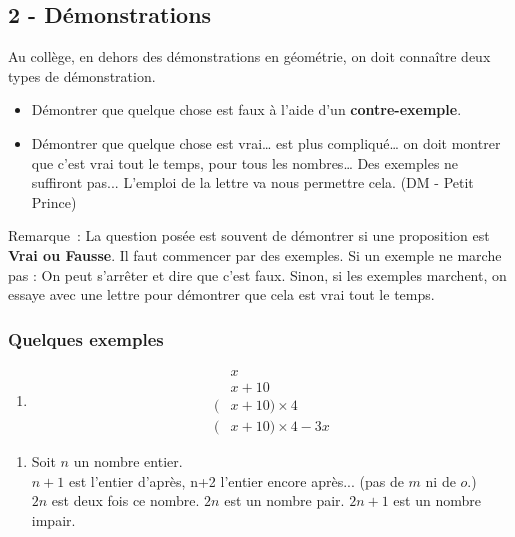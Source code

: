 \documentclass[11pt]{article}
\begin{document}
\subsection*{2 - Démonstrations}

Au collège, en dehors des démonstrations en géométrie, on doit connaître deux types de démonstration.

\begin{itemize}
\item Démontrer que quelque chose est faux à l’aide d’un \textbf{contre-exemple}.
\item Démontrer que quelque chose est vrai… est plus compliqué… on doit montrer que c’est vrai tout le temps, pour tous les nombres… Des exemples ne suffiront pas$...$ L’emploi de la lettre va nous permettre cela. (DM - Petit Prince)
\end{itemize} 

Remarque : La question posée est souvent de démontrer si une proposition est \textbf{Vrai ou Fausse}. Il faut commencer par des exemples. Si un exemple ne marche pas : On peut s'arrêter et dire que c'est faux. Sinon, si les exemples marchent, on essaye avec une lettre pour démontrer que cela est vrai tout le temps.

\subsubsection*{Quelques exemples}
\begin{multicols}{2}
  \begin{enumerate}
  \item[1.]


    \begin{align*}
      &x \\
      &x + 10 \\
      (&x + 10) \times 4 \\
      (&x + 10) \times 4 - 3x
    \end{align*}
  \end{enumerate}
\end{multicols}
\begin{enumerate}
\item[2.]
  Soit $n$ un nombre entier. \\
  $n+1$ est l'entier d'après, n+2 l'entier encore après... (pas de $m$ ni de $o$.)\\
  $2n$ est deux fois ce nombre. $2n$ est un nombre pair. $2n+1$ est un nombre impair.
\end{enumerate}
\end{document}
